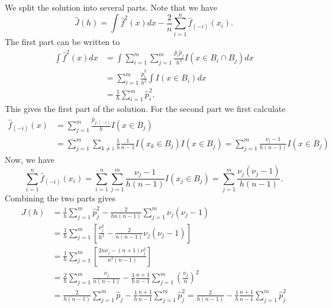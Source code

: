 We split the solution into several parts.
Note that we have
\begin{equation*}
    \hat{J}(h) = \int \hat{f}^2(x) dx - \frac{2}{n} \sum_{i = 1}^n \hat{f}_{(-i)}(x_i).
\end{equation*}
The first part can be written to
\begin{equation*}
    \begin{split}
        \int \hat{f}^2(x) dx
            &= \int \sum_{i = 1}^m \sum_{j = 1}^m \frac{\hat{p}_i \hat{p}_j}{h^2} I(x \in B_i \cap B_j) dx \\
            &= \sum_{i = 1}^m \frac{\hat{p}_i^2}{h^2} \int I(x \in B_i) dx \\
            &= \frac{1}{h} \sum_{i = 1}^m \hat{p}_i^2.
    \end{split}
\end{equation*}
This gives the first part of the solution.
For the second part we first calculate
\begin{equation*}
    \begin{split}
        \hat{f}_{(-i)}(x)
            &= \sum_{j = 1}^m \frac{\hat{p}_{j,(-i)}}{h} I(x \in B_j) \\
            &= \sum_{j = 1}^m \sum_{k \neq i} \frac{1}{h} \frac{1}{n - 1} I(x_k \in B_j) I(x \in B_j)
            = \sum_{j = 1}^m \frac{\nu_j - 1}{h(n - 1)} I(x \in B_j)
    \end{split}
\end{equation*}
Now, we have
\begin{equation*}
        \sum_{i = 1}^n \hat{f}_{(-i)}(x_i)
            = \sum_{i = 1}^n \sum_{j = 1}^m \frac{\nu_j - 1}{h(n - 1)} I(x_j \in B_j)
            = \sum_{j = 1}^m \frac{\nu_j (\nu_j - 1)}{h (n - 1)}.
\end{equation*}
Combining the two parts gives
\begin{equation*}
    \begin{split}
        \hat{J}(h) &= \frac{1}{h} \sum_{j = 1}^m \hat{p}_j^2 - \frac{2}{h n (n - 1)} \sum_{j = 1}^m \nu_j(\nu_j - 1) \\
            &= \frac{1}{h} \sum_{j = 1}^m \left[\frac{\nu_j^2}{h^2} - \frac{2}{n(n-1)} \nu_j(\nu_j - 1)\right] \\
            &= \frac{1}{h} \sum_{j = 1}^m \left[\frac{2 n \nu_j - (n + 1) \nu_j^2}{n^2 (n - 1)}\right] \\
            &= \frac{2}{h} \sum_{j = 1}^m \frac{\nu_j}{n(n-1)} - \frac{1}{h} \frac{n + 1}{n - 1} \sum_{j = 1}^m \left(\frac{\nu_j}{n}\right)^2 \\
            &= \frac{2}{h(n - 1)} \sum_{j = 1}^m \hat{p}_j - \frac{1}{h} \frac{n + 1}{n - 1} \sum_{j = 1}^m \hat{p}_j^2
            = \frac{2}{h(n - 1)} - \frac{1}{h} \frac{n + 1}{n - 1} \sum_{j = 1}^m \hat{p}_j^2
    \end{split}
\end{equation*}


